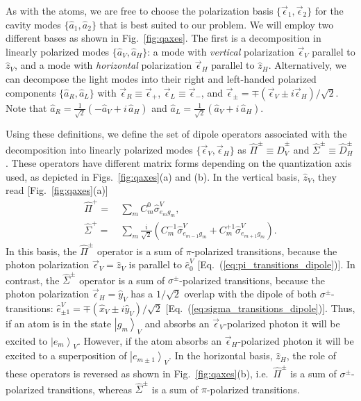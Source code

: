 \documentclass[aps,prx,superscriptaddress,twocolumn,notitlepage,nofootinbib,longbibliography]{revtex4-2}
\newcommand{\ket}[1]{\left|#1\right>}
\newcommand{\quv}{\hat{z}}
\begin{document}
As with the atoms, we are free to choose the polarization basis $\{\vec{\epsilon}_1,\vec{\epsilon}_2\}$ for the cavity modes $\{\hat{a}_1,\hat{a}_2\}$ that is best suited to our problem. We will employ two different bases as shown in Fig.~\ref{fig:qaxes}. The first is a decomposition in linearly polarized modes $\{\hat{a}_V,\hat{a}_H\}$: a mode with \emph{vertical} polarization $\vec{\epsilon}_V$ parallel to $\quv_V$, and a mode with \emph{horizontal} polarization $\vec{\epsilon}_H$ parallel to $\quv_H$. Alternatively, we can decompose the light modes into their right and left-handed polarized components $\{\hat{a}_R,\hat{a}_L\}$ with $\vec{\epsilon}_R\equiv \vec{\epsilon}_+$, $\vec{\epsilon}_L\equiv \vec{\epsilon}_-$, and $\vec{\epsilon}_\pm = \mp ( \vec{\epsilon}_V \pm i \vec{\epsilon}_H )/\sqrt{2}$.
Note that $\hat{a}_R = \frac{1}{\sqrt{2}} ( - \hat{a}_V + i\, \hat{a}_H )$ and $\hat{a}_L = \frac{1}{\sqrt{2}} ( \hat{a}_V + i\, \hat{a}_H )$.

Using these definitions, we define the set of dipole operators associated with the decomposition into linearly polarized modes $\{\vec{\epsilon}_V,\vec{\epsilon}_H\}$ as $\hat{\Pi}^\pm \equiv \hat{D}^\pm_V$ and $\hat{\Sigma}^\pm \equiv \hat{D}^\pm_H$.
These operators have different matrix forms depending on the quantization axis used, as depicted in Figs.~\ref{fig:qaxes}(a) and (b). In the vertical basis, $\quv_V$, they read [Fig.~\ref{fig:qaxes}(a)]
\begin{align}
	\hat{\Pi}^+ =&\, \sum_{m} C^0_m \hat{\sigma}^V_{e_m g_m} ,
\label{eq:def_Pi} \\
	\hat{\Sigma}^+ =&\, \sum_{m} \frac{i}{\sqrt{2}} \left( C^{-1}_m \hat{\sigma}^V_{e_{m-1} g_m} + C^{+1}_m \hat{\sigma}^V_{e_{m+1} g_m} \right) .
\label{eq:def_Sigma}
\end{align}
In this basis, the $\hat{\Pi}^\pm$ operator is a sum of $\pi$-polarized transitions, because the photon polarization $\vec{\epsilon}_V=\hat{z}_V $ is parallel to  $\hat{e}^V_0$ [Eq.~(\ref{eq:pi_transitions_dipole})]. 
In contrast, the $\hat{\Sigma}^\pm$ operator is a sum of $\sigma^\pm$-polarized transitions, because the photon polarization $\vec{\epsilon}_H = \hat{y}_V$  has a $1/\sqrt{2}$ overlap with the dipole of both $\sigma^\pm$-transitions: $\hat{e}^V_{\pm1} = \mp(\hat{x}_V \pm i \hat{y}_V)/\sqrt{2}$ [Eq.~(\ref{eq:sigma_transitions_dipole})]. 
Thus, if an atom is in the state $\ket{g_m}_V$ and absorbs an $\vec{\epsilon}_V$-polarized photon it will be excited to $\ket{e_m}_V$. However, if the atom absorbs an $\vec{\epsilon}_H$-polarized photon it will be excited to a superposition of $\ket{e_{m\pm1}}_V$.
In the horizontal basis, $\quv_H$, the role of these operators is reversed as shown in Fig.~\ref{fig:qaxes}(b), i.e.~$\hat{\Pi}^\pm$ is a sum of $\sigma^\pm$-polarized transitions, whereas $\hat{\Sigma}^\pm$ is a sum of $\pi$-polarized transitions.
\end{document}
